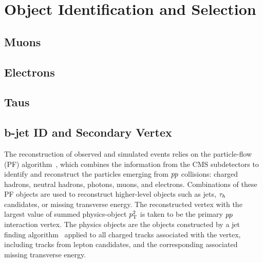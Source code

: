 \pagebreak
\section{Object Identification and Selection}
\subsection{Muons}
\subsection{Electrons}
\subsection{Taus}
\subsection{b-jet ID and Secondary Vertex}





The reconstruction of observed and simulated events relies on the particle-flow (PF) algorithm~\cite{Sirunyan:2017ulk},
which combines the information from the CMS subdetectors to identify
and reconstruct the particles emerging from $pp$ collisions:
charged hadrons, neutral hadrons, photons, muons, and electrons.
Combinations of these PF objects are used to reconstruct
higher-level objects such as jets, $\tau_{h}$ candidates, or
missing transverse energy.
The reconstructed vertex with the largest value of summed physics-object $p_\mathrm{T}^2$ is taken to be the primary $pp$ interaction vertex. The physics objects are the objects constructed by a jet finding algorithm~\cite{Cacciari:2008gp,Cacciari:2011ma} applied to all charged tracks associated with the vertex, including tracks from lepton candidates, and the corresponding associated missing transverse energy.

